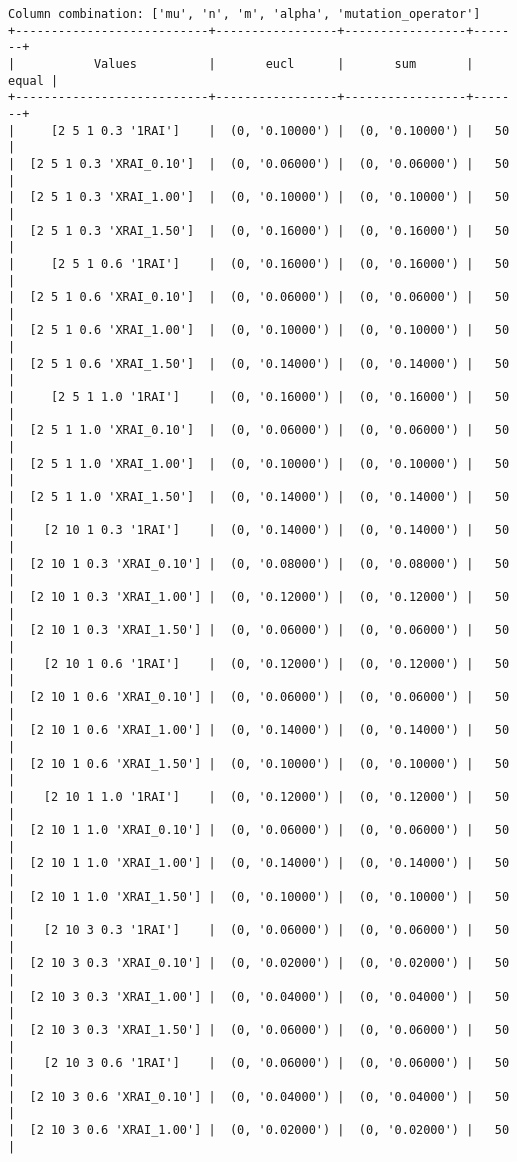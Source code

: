 \documentclass{article}
\begin{document}
\begin{verbatim}
Column combination: ['mu', 'n', 'm', 'alpha', 'mutation_operator']
+---------------------------+-----------------+-----------------+-------+
|           Values          |       eucl      |       sum       | equal |
+---------------------------+-----------------+-----------------+-------+
|     [2 5 1 0.3 '1RAI']    |  (0, '0.10000') |  (0, '0.10000') |   50  |
|  [2 5 1 0.3 'XRAI_0.10']  |  (0, '0.06000') |  (0, '0.06000') |   50  |
|  [2 5 1 0.3 'XRAI_1.00']  |  (0, '0.10000') |  (0, '0.10000') |   50  |
|  [2 5 1 0.3 'XRAI_1.50']  |  (0, '0.16000') |  (0, '0.16000') |   50  |
|     [2 5 1 0.6 '1RAI']    |  (0, '0.16000') |  (0, '0.16000') |   50  |
|  [2 5 1 0.6 'XRAI_0.10']  |  (0, '0.06000') |  (0, '0.06000') |   50  |
|  [2 5 1 0.6 'XRAI_1.00']  |  (0, '0.10000') |  (0, '0.10000') |   50  |
|  [2 5 1 0.6 'XRAI_1.50']  |  (0, '0.14000') |  (0, '0.14000') |   50  |
|     [2 5 1 1.0 '1RAI']    |  (0, '0.16000') |  (0, '0.16000') |   50  |
|  [2 5 1 1.0 'XRAI_0.10']  |  (0, '0.06000') |  (0, '0.06000') |   50  |
|  [2 5 1 1.0 'XRAI_1.00']  |  (0, '0.10000') |  (0, '0.10000') |   50  |
|  [2 5 1 1.0 'XRAI_1.50']  |  (0, '0.14000') |  (0, '0.14000') |   50  |
|    [2 10 1 0.3 '1RAI']    |  (0, '0.14000') |  (0, '0.14000') |   50  |
|  [2 10 1 0.3 'XRAI_0.10'] |  (0, '0.08000') |  (0, '0.08000') |   50  |
|  [2 10 1 0.3 'XRAI_1.00'] |  (0, '0.12000') |  (0, '0.12000') |   50  |
|  [2 10 1 0.3 'XRAI_1.50'] |  (0, '0.06000') |  (0, '0.06000') |   50  |
|    [2 10 1 0.6 '1RAI']    |  (0, '0.12000') |  (0, '0.12000') |   50  |
|  [2 10 1 0.6 'XRAI_0.10'] |  (0, '0.06000') |  (0, '0.06000') |   50  |
|  [2 10 1 0.6 'XRAI_1.00'] |  (0, '0.14000') |  (0, '0.14000') |   50  |
|  [2 10 1 0.6 'XRAI_1.50'] |  (0, '0.10000') |  (0, '0.10000') |   50  |
|    [2 10 1 1.0 '1RAI']    |  (0, '0.12000') |  (0, '0.12000') |   50  |
|  [2 10 1 1.0 'XRAI_0.10'] |  (0, '0.06000') |  (0, '0.06000') |   50  |
|  [2 10 1 1.0 'XRAI_1.00'] |  (0, '0.14000') |  (0, '0.14000') |   50  |
|  [2 10 1 1.0 'XRAI_1.50'] |  (0, '0.10000') |  (0, '0.10000') |   50  |
|    [2 10 3 0.3 '1RAI']    |  (0, '0.06000') |  (0, '0.06000') |   50  |
|  [2 10 3 0.3 'XRAI_0.10'] |  (0, '0.02000') |  (0, '0.02000') |   50  |
|  [2 10 3 0.3 'XRAI_1.00'] |  (0, '0.04000') |  (0, '0.04000') |   50  |
|  [2 10 3 0.3 'XRAI_1.50'] |  (0, '0.06000') |  (0, '0.06000') |   50  |
|    [2 10 3 0.6 '1RAI']    |  (0, '0.06000') |  (0, '0.06000') |   50  |
|  [2 10 3 0.6 'XRAI_0.10'] |  (0, '0.04000') |  (0, '0.04000') |   50  |
|  [2 10 3 0.6 'XRAI_1.00'] |  (0, '0.02000') |  (0, '0.02000') |   50  |

\end{verbatim}
\end{document}
